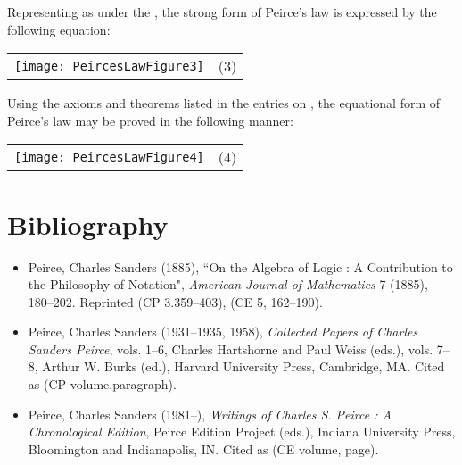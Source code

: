 \documentclass[12pt]{article}
\begin{document}
Representing  as  under the , the strong form of Peirce's law is expressed by the following equation:

\begin{center}\begin{tabular}{cc}
\texttt{[image: PeircesLawFigure3]} & (3) \\
\end{tabular}\end{center}

Using the axioms and theorems listed in the entries on , the equational form of Peirce's law may be proved in the following manner:

\begin{center}\begin{tabular}{cc}
\texttt{[image: PeircesLawFigure4]} & (4) \\
\end{tabular}\end{center}

\section{Bibliography}

\begin{itemize}
\item
Peirce, Charles Sanders (1885), ``On the Algebra of Logic : A Contribution to the Philosophy of Notation", \textit{American Journal of Mathematics} 7 (1885), 180--202.  Reprinted (CP 3.359--403), (CE 5, 162--190).
\item
Peirce, Charles Sanders (1931--1935, 1958), \textit{Collected Papers of Charles Sanders Peirce}, vols. 1--6, Charles Hartshorne and Paul Weiss (eds.), vols. 7--8, Arthur W. Burks (ed.), Harvard University Press, Cambridge, MA.  Cited as (CP volume.paragraph).
\item
Peirce, Charles Sanders (1981--), \textit{Writings of Charles S. Peirce : A Chronological Edition}, Peirce Edition Project (eds.), Indiana University Press, Bloomington and Indianapolis, IN.  Cited as (CE volume, page).
\end{itemize}

\end{document}
